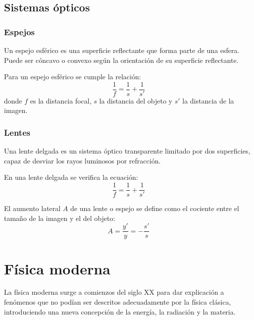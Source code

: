 \documentclass[10pt]{article}
\begin{document}
\subsection{Sistemas ópticos}

\subsubsection{Espejos}

\begin{definition}
  Un espejo esférico es una superficie reflectante que forma parte de una esfera. Puede ser cóncavo o convexo según la orientación de su superficie reflectante.
\end{definition}

\begin{theorem}
  Para un espejo esférico se cumple la relación:
  \[ \frac{1}{f} = \frac{1}{s} + \frac{1}{s'} \]
  donde $f$ es la distancia focal, $s$ la distancia del objeto y $s'$ la distancia de la imagen.
\end{theorem}

\subsubsection{Lentes}

\begin{definition}
  Una lente delgada es un sistema óptico transparente limitado por dos superficies, capaz de desviar los rayos luminosos por refracción.
\end{definition}

\begin{theorem}
  En una lente delgada se verifica la ecuación:
  \[ \frac{1}{f} = \frac{1}{s} + \frac{1}{s'} \]
\end{theorem}

\begin{definition}
  El aumento lateral $A$ de una lente o espejo se define como el cociente entre el tamaño de la imagen y el del objeto:
  \[ A = \frac{y'}{y} = -\frac{s'}{s} \]
\end{definition}

\section{Física moderna}

La física moderna surge a comienzos del siglo XX para dar explicación a fenómenos que no podían ser descritos adecuadamente por la física clásica, introduciendo una nueva concepción de la energía, la radiación y la materia.
\end{document}
